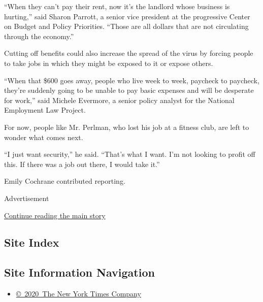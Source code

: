 ``When they can't pay their rent, now it's the landlord whose business
is hurting,'' said Sharon Parrott, a senior vice president at the
progressive Center on Budget and Policy Priorities. ``Those are all
dollars that are not circulating through the economy.''

Cutting off benefits could also increase the spread of the virus by
forcing people to take jobs in which they might be exposed to it or
expose others.

``When that \$600 goes away, people who live week to week, paycheck to
paycheck, they're suddenly going to be unable to pay basic expenses and
will be desperate for work,'' said Michele Evermore, a senior policy
analyst for the National Employment Law Project.

For now, people like Mr. Perlman, who lost his job at a fitness club,
are left to wonder what comes next.

``I just want security,'' he said. ``That's what I want. I'm not looking
to profit off this. If there was a job out there, I would take it.''

Emily Cochrane contributed reporting.

Advertisement

\protect\hyperlink{after-bottom}{Continue reading the main story}

\hypertarget{site-index}{%
\subsection{Site Index}\label{site-index}}

\hypertarget{site-information-navigation}{%
\subsection{Site Information
Navigation}\label{site-information-navigation}}

\begin{itemize}
\tightlist
\item
  \href{https://help.nytimes.com/hc/en-us/articles/115014792127-Copyright-notice}{©~2020~The
  New York Times Company}
\end{itemize}

